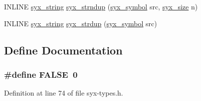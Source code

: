 \begin{CompactItemize}
\item 
INLINE \hyperlink{syx-types_8h_1bff1fd86072dd98849437bc9dcb35c3}{syx\_\-string} \hyperlink{syx-types_8h_d155efe16b514198d225ce33322cca13}{syx\_\-strndup} (\hyperlink{syx-types_8h_9663af54b7b72f5d8be5f754ef356525}{syx\_\-symbol} src, \hyperlink{syx-types_8h_c33c3b1cda2a02ee8987fd22f1ce89be}{syx\_\-size} n)
\item 
INLINE \hyperlink{syx-types_8h_1bff1fd86072dd98849437bc9dcb35c3}{syx\_\-string} \hyperlink{syx-types_8h_c622723fb87eeb4c68598e317e0b1ed1}{syx\_\-strdup} (\hyperlink{syx-types_8h_9663af54b7b72f5d8be5f754ef356525}{syx\_\-symbol} src)
\end{CompactItemize}


\subsection{Define Documentation}
\hypertarget{syx-types_8h_a93f0eb578d23995850d61f7d61c55c1}{
\subsubsection{\setlength{\rightskip}{0pt plus 5cm}\#define FALSE~0}}
\label{syx-types_8h_a93f0eb578d23995850d61f7d61c55c1}




Definition at line 74 of file syx-types.h.

